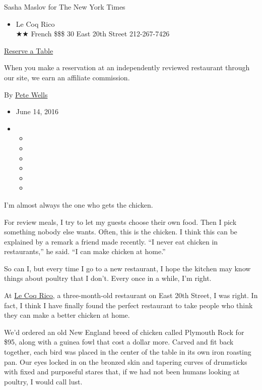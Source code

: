 Sasha Maslov for The New York Times

\begin{itemize}
\tightlist
\item
  Le Coq Rico\\
  ★★ French \$\$\$ 30 East 20th Street 212-267-7426
\end{itemize}

\href{http://www.opentable.com/single.aspx?ref=4201\&rid=168787}{Reserve
a Table}

When you make a reservation at an independently reviewed restaurant
through our site, we earn an affiliate commission.

By \href{http://www.nytimes3xbfgragh.onion/by/pete-wells}{Pete Wells}

\begin{itemize}
\item
  June 14, 2016
\item
  \begin{itemize}
  \item
  \item
  \item
  \item
  \item
  \item
  \end{itemize}
\end{itemize}

I'm almost always the one who gets the chicken.

For review meals, I try to let my guests choose their own food. Then I
pick something nobody else wants. Often, this is the chicken. I think
this can be explained by a remark a friend made recently. ``I never eat
chicken in restaurants,'' he said. ``I can make chicken at home.''

So can I, but every time I go to a new restaurant, I hope the kitchen
may know things about poultry that I don't. Every once in a while, I'm
right.

At \href{http://www.lecoqriconyc.com/}{Le Coq Rico,} a three-month-old
restaurant on East 20th Street, I was right. In fact, I think I have
finally found the perfect restaurant to take people who think they can
make a better chicken at home.

We'd ordered an old New England breed of chicken called Plymouth Rock
for \$95, along with a guinea fowl that cost a dollar more. Carved and
fit back together, each bird was placed in the center of the table in
its own iron roasting pan. Our eyes locked in on the bronzed skin and
tapering curves of drumsticks with fixed and purposeful stares that, if
we had not been humans looking at poultry, I would call lust.

